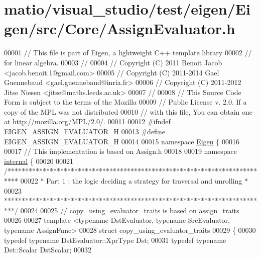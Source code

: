 \hypertarget{matio_2visual__studio_2test_2eigen_2_eigen_2src_2_core_2_assign_evaluator_8h_source}{}\section{matio/visual\+\_\+studio/test/eigen/\+Eigen/src/\+Core/\+Assign\+Evaluator.h}
\label{matio_2visual__studio_2test_2eigen_2_eigen_2src_2_core_2_assign_evaluator_8h_source}

\begin{DoxyCode}
00001 \textcolor{comment}{// This file is part of Eigen, a lightweight C++ template library}
00002 \textcolor{comment}{// for linear algebra.}
00003 \textcolor{comment}{//}
00004 \textcolor{comment}{// Copyright (C) 2011 Benoit Jacob <jacob.benoit.1@gmail.com>}
00005 \textcolor{comment}{// Copyright (C) 2011-2014 Gael Guennebaud <gael.guennebaud@inria.fr>}
00006 \textcolor{comment}{// Copyright (C) 2011-2012 Jitse Niesen <jitse@maths.leeds.ac.uk>}
00007 \textcolor{comment}{//}
00008 \textcolor{comment}{// This Source Code Form is subject to the terms of the Mozilla}
00009 \textcolor{comment}{// Public License v. 2.0. If a copy of the MPL was not distributed}
00010 \textcolor{comment}{// with this file, You can obtain one at http://mozilla.org/MPL/2.0/.}
00011 
00012 \textcolor{preprocessor}{#ifndef EIGEN\_ASSIGN\_EVALUATOR\_H}
00013 \textcolor{preprocessor}{#define EIGEN\_ASSIGN\_EVALUATOR\_H}
00014 
00015 \textcolor{keyword}{namespace }\hyperlink{namespace_eigen}{Eigen} \{
00016 
00017 \textcolor{comment}{// This implementation is based on Assign.h}
00018 
00019 \textcolor{keyword}{namespace }\hyperlink{namespaceinternal}{internal} \{
00020   
00021 \textcolor{comment}{/***************************************************************************}
00022 \textcolor{comment}{* Part 1 : the logic deciding a strategy for traversal and unrolling       *}
00023 \textcolor{comment}{***************************************************************************/}
00024 
00025 \textcolor{comment}{// copy\_using\_evaluator\_traits is based on assign\_traits}
00026 
00027 \textcolor{keyword}{template} <\textcolor{keyword}{typename} DstEvaluator, \textcolor{keyword}{typename} SrcEvaluator, \textcolor{keyword}{typename} AssignFunc>
00028 \textcolor{keyword}{struct }copy\_using\_evaluator\_traits
00029 \{
00030   \textcolor{keyword}{typedef} \textcolor{keyword}{typename} DstEvaluator::XprType Dst;
00031   \textcolor{keyword}{typedef} \textcolor{keyword}{typename} Dst::Scalar DstScalar;
00032   

\end{DoxyCode}
